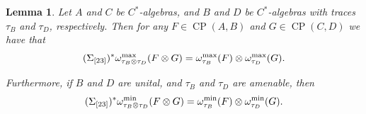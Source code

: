 \documentclass[11pt, a4paper, oneside, final, reqno]{amsart}
\newcommand{\CP}{\operatorname{CP}}
\theoremstyle{definition}
\theoremstyle{plain}
\newtheorem{lemma}[definition]{Lemma}
\theoremstyle{remark}
\numberwithin{equation}{section}
\begin{document}
\begin{lemma}\label{lemma:flip of omega_tau of tensor prods}
    Let $A$ and $C$ be $C^*$-algebras, and $B$ and $D$ be $C^*$-algebras with traces $\tau_B$ and $\tau_D$, respectively. Then for any $F \in \CP(A,B)$ and $G \in \CP(C,D)$ we have that
    \begin{equation}\label{eqn:flip of omega_tau max tensor}
        (\Sigma_{[23]})^*\omega_{\tau_B \otimes \tau_D}^{\rm max}(F \otimes G)
        = \omega_{\tau_B}^{\rm max}(F) \otimes \omega_{\tau_D}^{\rm max}(G).
    \end{equation}

    Furthermore, if $B$ and $D$ are unital, and $\tau_B$ and $\tau_D$ are amenable, then
    \begin{equation}\label{eqn:flip of omega_tau min tensor}
        (\Sigma_{[23]})^*\omega_{\tau_B \otimes \tau_D}^{\rm min}(F \otimes G)
        = \omega_{\tau_B}^{\rm min}(F) \otimes \omega_{\tau_D}^{\rm min}(G).
    \end{equation}
\end{lemma}
\end{document}
